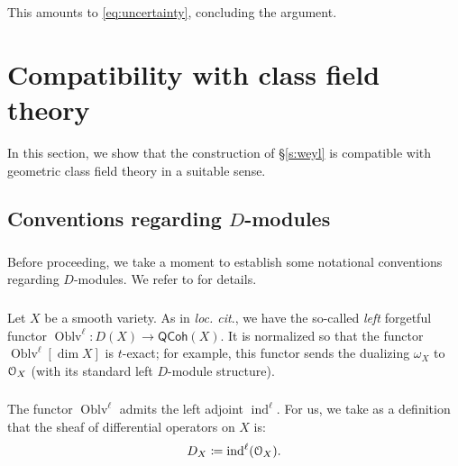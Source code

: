 \documentclass[reqno,11pt]{amsart}
\numberwithin{equation}{subsection}
\theoremstyle{remark}
\newcommand{\sO}{{\EuScript O}}
\newcommand{\on}{\operatorname}
\newcommand{\ind}{\on{ind}}
\newcommand{\Oblv}{\on{Oblv}}
\newcommand{\QCoh}{\mathsf{QCoh}}
\begin{document}
\noindent This amounts to \eqref{eq:uncertainty}, concluding
the argument.




%
%
%

\section{Compatibility with class field theory}\label{s:cft}

In this section, we show that the construction of \S \ref{s:weyl} is compatible
with geometric class field theory in a suitable sense. 

\subsection{Conventions regarding $D$-modules}\label{ss:diff-1}

\subsubsection{} Before proceeding, we take a moment to establish some
notational conventions regarding $D$-modules. 
We refer to \cite{crystals} for details.

\subsubsection{}

Let $X$ be a smooth variety. As in \emph{loc. cit}., 
we have the so-called \emph{left} forgetful functor 
$\Oblv^{\ell}:D(X) \to \QCoh(X)$. It is normalized
so that the functor $\Oblv^{\ell}[\dim X]$
is $t$-exact; for example, this functor sends the dualizing
$\omega_X$ to $\sO_X$ (with its standard left $D$-module structure).

\subsubsection{}

The functor $\Oblv^{\ell}$ admits the left adjoint
$\ind^{\ell}$. For us, we take as a definition that the sheaf of
differential operators on $X$ is:
%
\[
D_X \coloneqq \ind^{\ell}(\sO_X).
\] 
\end{document}
